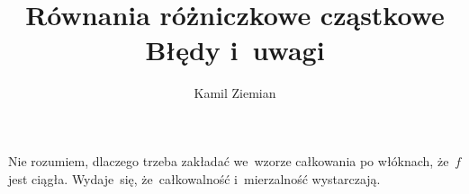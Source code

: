 \documentclass[a4paper,11pt]{article}
\title{Równania różniczkowe cząstkowe \\
  {\Large Błędy i~uwagi}}
\author{Kamil Ziemian}
\begin{document}





\maketitle %






\vspace{0em}



\vspace{0em}


\noindent
{}

\vspace{\spaceFour}





\noindent
{} Nie rozumiem, dlaczego trzeba zakładać we~wzorze całkowania po
włóknach, że~$f$ jest ciągła. Wydaje~się, że~całkowalność i~mierzalność
wystarczają.

\vspace{\spaceFour}






\end{document}
